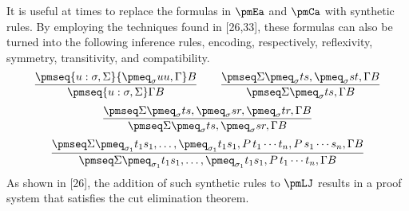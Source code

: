 It is useful at times to replace the formulas in $\pmEa$ and $\pmCa$ with synthetic rules. By employing the techniques found in [26,33], these formulas can also be turned into the following inference rules, encoding, respectively, reflexivity, symmetry, transitivity, and compatibility.
\[\frac{\pmseq{u:\sigma,\Sigma}{\pmeq_\sigma u u,\Gamma}B}{\pmseq{u:\sigma,\Sigma}\Gamma B}\qquad
\frac{\pmseq\Sigma{\pmeq_\sigma t s,\pmeq_\sigma s t,\Gamma}B}{\pmseq\Sigma{\pmeq_\sigma t s,\Gamma}B}\]
\[\frac{\pmseq\Sigma{\pmeq_\sigma t s,\pmeq_\sigma s r,\pmeq_\sigma t r,\Gamma}B}{\pmseq\Sigma{\pmeq_\sigma t s,\pmeq_\sigma s r,\Gamma}B}\]
\[\frac{\pmseq\Sigma{\pmeq_{\sigma_1}t_1s_1,\ldots,\pmeq_{\sigma_1}t_1s_1,P\,t_1\cdots t_n,P\,s_1\cdots s_n,\Gamma}B}{\pmseq\Sigma{\pmeq_{\sigma_1}t_1s_1,\ldots,\pmeq_{\sigma_1}t_1s_1,P\,t_1\cdots t_n,\Gamma}B}\]
As shown in [26], the addition of such synthetic rules to $\pmLJ$ results in a proof system that satisfies the cut elimination theorem.

